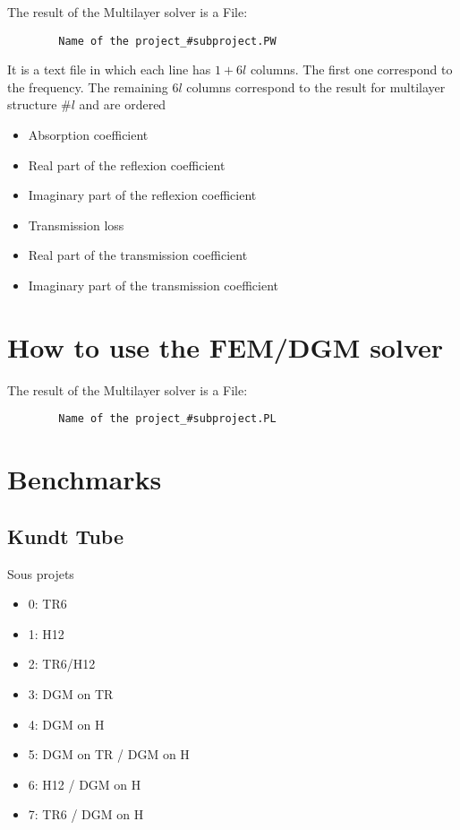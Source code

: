 \documentclass[11pt,A4paper]{book}
\renewcommand{\:}{\tb{:}}
\begin{document}
The result of the Multilayer solver is a File:
\begin{center}
	\begin{verbatim}
		Name of the project_#subproject.PW
	\end{verbatim}
\end{center}
It is a text file in which each line has $1+6l$ columns. The first one correspond to the frequency. The remaining $6l$ columns correspond to the result for multilayer structure $\#l$ and are ordered
\begin{itemize}
	\item Absorption coefficient
	\item Real part of the reflexion coefficient
	\item Imaginary part of the reflexion coefficient
	\item Transmission loss
	\item Real part of the transmission coefficient
	\item Imaginary part of the transmission coefficient
\end{itemize}


\chapter{How to use the FEM/DGM solver}


The result of the Multilayer solver is a File:
\begin{center}
	\begin{verbatim}
		Name of the project_#subproject.PL
	\end{verbatim}
\end{center}





\chapter{Benchmarks}

\section{Kundt Tube}

Sous projets
\begin{itemize}
	\item 0: TR6
	\item 1: H12
	\item 2: TR6/H12
	\item 3: DGM on TR
	\item 4: DGM on H
	\item 5: DGM on TR / DGM on H
	\item 6: H12 / DGM on H
	\item 7: TR6 / DGM on H  
\end{itemize}
\end{document}
